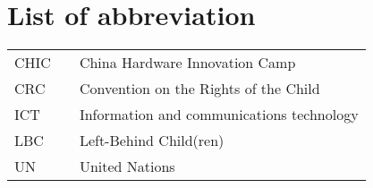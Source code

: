 \section*{List of abbreviation}


\begin{table}[ht]
    \centering
    \begin{tabular}{lll}
        CHIC    &&      China Hardware Innovation Camp \\
        CRC     &&      Convention on the Rights of the Child \\
        ICT     &&      Information and communications technology \\
        LBC     &&      Left-Behind Child(ren) \\
        UN      &&      United Nations 
    \end{tabular}
\end{table}